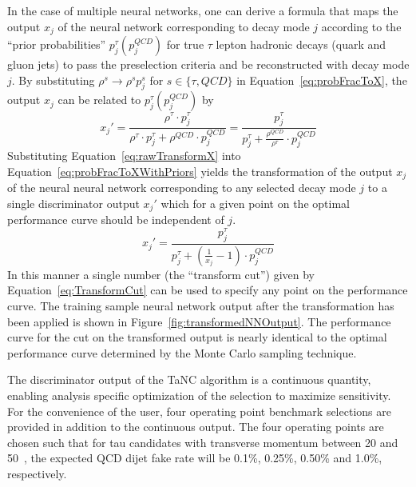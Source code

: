 In the case of multiple neural networks, one can derive a formula that maps the
output $x_j$ of the neural network corresponding to decay mode $j$ according to
the ``prior probabilities'' $p_j^\tau (p_j^{QCD})$ for true $\tau$ lepton
hadronic decays (quark and gluon jets) to pass the preselection criteria and
be reconstructed with decay mode $j$.
By substituting $\rho^s \rightarrow \rho^s p_j^s$ for $s \in \{\tau, QCD\}$ in
Equation~\ref{eq:probFracToX}, the output $x_j$ can be related to $p_j^\tau
(p_j^{QCD})$ by 
\begin{equation}
   x_j' = \frac{\rho^\tau \cdot p_j^\tau} 
   {\rho^\tau \cdot p_j^\tau + \rho^{QCD} \cdot p_j^{QCD} }
   = \frac{p_j^\tau} 
   {p_j^\tau + \frac{\rho^{QCD}}{\rho^\tau} \cdot p_j^{QCD} }
   \label{eq:probFracToXWithPriors}
\end{equation}
Substituting Equation~\ref{eq:rawTransformX} into
Equation~\ref{eq:probFracToXWithPriors} yields the transformation of the output
$x_j$ of the neural neural network corresponding to any selected decay mode $j$
to a single discriminator output $x_j'$ which for a given point on the optimal
performance curve should be independent of $j$.
\begin{equation}
   x_j' = \frac{p_j^\tau} 
   {p_j^\tau + \left(\frac{1}{x_j}-1\right)\cdot p_j^{QCD} }
   \label{eq:TransformCut}
\end{equation}
In this manner a single number (the ``transform cut'') given by
Equation~\ref{eq:TransformCut} can be used to specify any point on the
performance curve.  The training sample neural network output after the
transformation has been applied is shown in
Figure~\ref{fig:transformedNNOutput}.  The performance curve for the cut on the
transformed output is nearly identical to the optimal performance curve
determined by the Monte Carlo sampling technique. 

The discriminator output of the TaNC algorithm is a continuous quantity,
enabling analysis specific optimization of the selection to maximize
sensitivity.  For the convenience of the user, four operating point benchmark
selections are provided in addition to the continuous output. The four operating
points are chosen such that for tau candidates with transverse momentum between
20 and 50~\GeVc, the expected QCD dijet fake rate will be 0.1\%, 0.25\%,
0.50\% and 1.0\%, respectively.  

